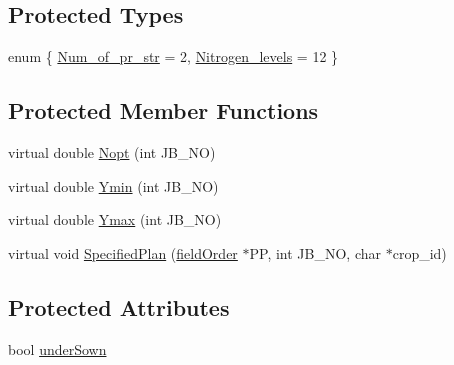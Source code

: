 \subsection*{Protected Types}
\begin{DoxyCompactItemize}
\item 
enum \{ \hyperlink{classstatic_maize_aba311191464184758a2c2b2eb819a558a6c12b1b6b3c696ced0209428169b25e8}{Num\_\-of\_\-pr\_\-str} = 2, 
\hyperlink{classstatic_maize_aba311191464184758a2c2b2eb819a558a2106fe747427a927e52573ab3db6fc46}{Nitrogen\_\-levels} = 12
 \}
\end{DoxyCompactItemize}
\subsection*{Protected Member Functions}
\begin{DoxyCompactItemize}
\item 
virtual double \hyperlink{classstatic_maize_a8ec3a9f8b30656d537fa8b44a8905be7}{Nopt} (int JB\_\-NO)
\item 
virtual double \hyperlink{classstatic_maize_a3eaafefd01df095524580ac1fb026697}{Ymin} (int JB\_\-NO)
\item 
virtual double \hyperlink{classstatic_maize_a1f3847a4d1509dc568d21405de42afb5}{Ymax} (int JB\_\-NO)
\item 
virtual void \hyperlink{classstatic_maize_ae29df9ec33e841c6fd482c96f330b41c}{SpecifiedPlan} (\hyperlink{classfield_order}{fieldOrder} $\ast$PP, int JB\_\-NO, char $\ast$crop\_\-id)
\end{DoxyCompactItemize}
\subsection*{Protected Attributes}
\begin{DoxyCompactItemize}
\item 
bool \hyperlink{classstatic_maize_a741540de20c7cd002125e391bbd272ef}{underSown}
\end{DoxyCompactItemize}


